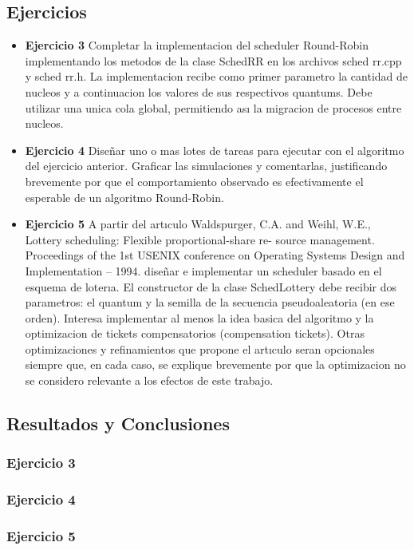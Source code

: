 
\subsection{Ejercicios}
\begin{itemize}
 \item 
\textbf{Ejercicio 3}  Completar la implementacion del scheduler Round-Robin implementando los
metodos de la clase SchedRR en los archivos sched rr.cpp y sched rr.h. La implementacion
recibe como primer parametro la cantidad de nucleos y a continuacion los valores de sus
respectivos quantums. Debe utilizar una unica cola global, permitiendo ası la migracion de
procesos entre nucleos.
\item \textbf{Ejercicio 4} Diseñar uno o mas lotes de tareas para ejecutar con el algoritmo del ejercicio
anterior. Graficar las simulaciones y comentarlas, justificando brevemente por que el comportamiento 
observado es efectivamente el esperable de un algoritmo Round-Robin.
\item \textbf{Ejercicio 5} A partir del artıculo
Waldspurger, C.A. and Weihl, W.E., Lottery scheduling: Flexible proportional-share re-
source management. Proceedings of the 1st USENIX conference on Operating Systems
Design and Implementation – 1994.
diseñar e implementar un scheduler basado en el esquema de loterıa. El constructor de la
clase SchedLottery debe recibir dos parametros: el quantum y la semilla de la secuencia
pseudoaleatoria (en ese orden). Interesa implementar al menos la idea basica del algoritmo
y la optimizacion de tickets compensatorios (compensation tickets). Otras optimizaciones y
refinamientos que propone el artıculo seran opcionales siempre que, en cada caso, se explique
brevemente por que la optimizacion no se considero relevante a los efectos de este trabajo.

\end{itemize}


\subsection{Resultados y Conclusiones}

\subsubsection[Resolución Ejercicio 3]{Ejercicio 3}

\subsubsection[Resolución Ejercicio 4]{Ejercicio 4}

\subsubsection[Resolución Ejercicio 5]{Ejercicio 5}
